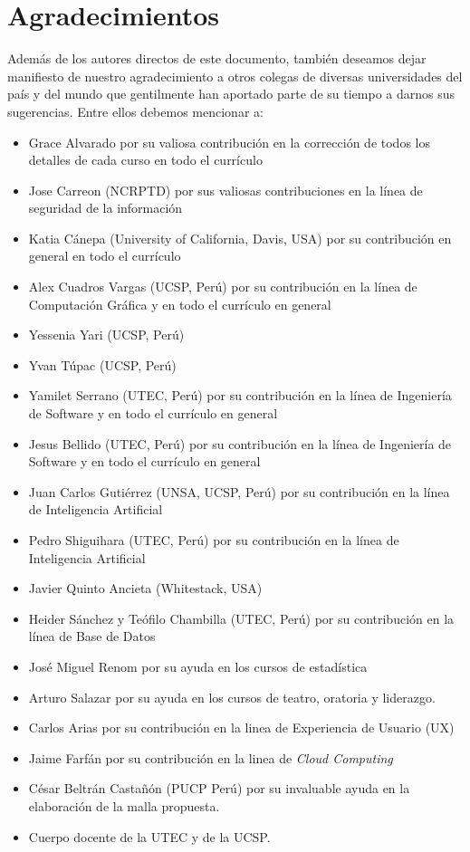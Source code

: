 \chapter*{Agradecimientos}\label{chap:cs-ack}
%

Además de los autores directos de este documento, también deseamos dejar manifiesto de nuestro 
agradecimiento a otros colegas de diversas universidades del país y del mundo que gentilmente 
han aportado parte de su tiempo a darnos sus sugerencias. Entre ellos debemos mencionar a:

\begin{itemize}
\item Grace Alvarado por su valiosa contribución en la corrección de todos los detalles de cada curso en todo el currículo
\item Jose Carreon (NCRPTD) por sus valiosas contribuciones en la línea de seguridad de la información
\item Katia Cánepa (University of California, Davis, USA) por su contribución en general en todo el currículo
\item Alex Cuadros Vargas (UCSP, Perú) por su contribución en la línea de Computación Gráfica y en todo el currículo en general
\item Yessenia Yari (UCSP, Perú)
\item Yvan Túpac (UCSP, Perú)
\item Yamilet Serrano (UTEC, Perú) por su contribución en la línea de Ingeniería de Software y en todo el currículo en general
\item Jesus Bellido (UTEC, Perú) por su contribución en la línea de Ingeniería de Software y en todo el currículo en general
\item Juan Carlos Gutiérrez (UNSA, UCSP, Perú) por su contribución en la línea de Inteligencia Artificial 
\item Pedro Shiguihara (UTEC, Perú) por su contribución en la línea de Inteligencia Artificial 
\item Javier Quinto Ancieta (Whitestack, USA)
\item Heider Sánchez y Teófilo Chambilla (UTEC, Perú) por su contribución en la línea de Base de Datos
\item José Miguel Renom por su ayuda en los cursos de estadística
\item Arturo Salazar por su ayuda en los cursos de teatro, oratoria y liderazgo.
\item Carlos Arias por su contribución en la linea de Experiencia de Usuario (UX)
\item Jaime Farfán por su contribución en la linea de \textit{Cloud Computing}
\item César Beltrán Castañón (PUCP Perú) por su invaluable ayuda en la elaboración de la malla propuesta.
\item Cuerpo docente de la UTEC y de la UCSP.
\end{itemize}

